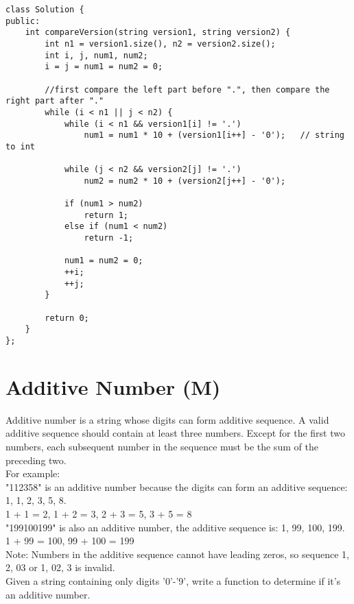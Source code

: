 \begin{lstlisting}
class Solution {
public:
    int compareVersion(string version1, string version2) {
        int n1 = version1.size(), n2 = version2.size();
        int i, j, num1, num2;
        i = j = num1 = num2 = 0;
        
        //first compare the left part before ".", then compare the right part after "."
        while (i < n1 || j < n2) {
            while (i < n1 && version1[i] != '.')
                num1 = num1 * 10 + (version1[i++] - '0');   // string to int

            while (j < n2 && version2[j] != '.')
                num2 = num2 * 10 + (version2[j++] - '0');
            
            if (num1 > num2)
                return 1;
            else if (num1 < num2)
                return -1;
            
            num1 = num2 = 0;
            ++i;
            ++j;
        }
        
        return 0;
    }
};
\end{lstlisting}


\section{Additive Number (M)}
Additive number is a string whose digits can form additive sequence. A valid additive sequence should contain at least three numbers. Except for the first two numbers, each subsequent number in the sequence must be the sum of the preceding two.\\

For example:\\

"112358" is an additive number because the digits can form an additive sequence: 1, 1, 2, 3, 5, 8.\\
1 + 1 = 2, 1 + 2 = 3, 2 + 3 = 5, 3 + 5 = 8\\

"199100199" is also an additive number, the additive sequence is: 1, 99, 100, 199.\\
1 + 99 = 100, 99 + 100 = 199\\

Note: Numbers in the additive sequence cannot have leading zeros, so sequence 1, 2, 03 or 1, 02, 3 is invalid.\\

Given a string containing only digits '0'-'9', write a function to determine if it's an additive number.\\

